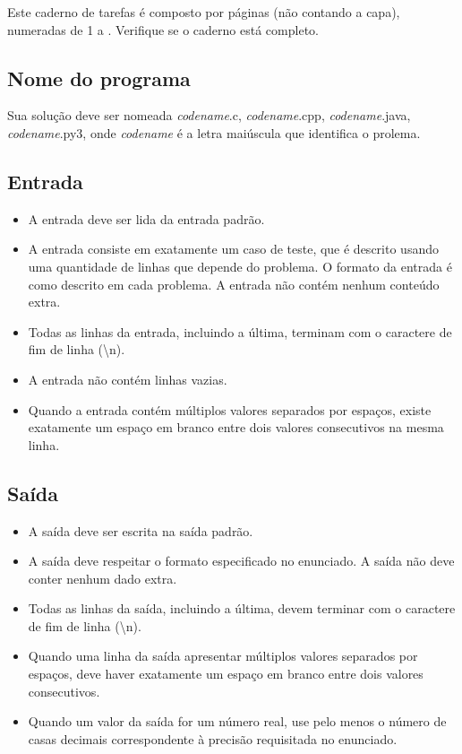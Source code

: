 Este caderno de tarefas é composto por \pageref{lastpage} páginas (não
contando a capa), numeradas 
de 1 a \pageref{lastpage}. Verifique se o caderno está completo.

\subsection*{Nome do programa}
Sua solução deve ser nomeada \textit{codename}.c, \textit{codename}.cpp, \textit{codename}.java, \textit{codename}.py3, onde \textit{codename } é a letra maiúscula que identifica o prolema.

\subsection*{Entrada}

\begin{itemize}
\item A entrada deve ser lida da entrada padrão.

\item A entrada consiste em exatamente um caso de teste, que é descrito usando uma
quantidade de linhas que depende do problema. O formato da entrada é como descrito
em cada problema. A entrada não contém nenhum conteúdo extra.

\item Todas as linhas da entrada, incluindo a última, terminam com o caractere de fim
de linha (\textbackslash n).

\item A entrada não contém linhas vazias.

\item Quando a entrada contém múltiplos valores separados por espaços, 
existe exatamente um espaço em branco entre dois valores consecutivos na mesma linha.

\end{itemize}

\subsection*{Saída}

\begin{itemize}

\item A saída deve ser escrita na saída padrão.

\item A saída deve respeitar o formato especificado no enunciado. A saída não deve
conter nenhum dado extra.

\item Todas as linhas da saída, incluindo a última, devem terminar com o caractere de fim
de linha (\textbackslash n).

\item Quando uma linha da saída apresentar múltiplos valores separados por espaços, deve haver
exatamente um espaço em branco entre dois valores consecutivos.

\item Quando um valor da saída for um número real, use pelo menos o número de casas decimais correspondente
à precisão requisitada no enunciado.

\end{itemize}
